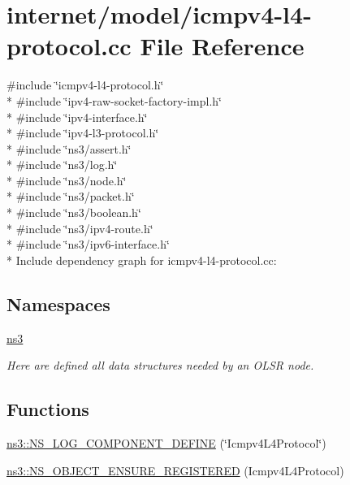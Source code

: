 \hypertarget{icmpv4-l4-protocol_8cc}{}\section{internet/model/icmpv4-\/l4-\/protocol.cc File Reference}
\label{icmpv4-l4-protocol_8cc}
{\ttfamily \#include \char`\"{}icmpv4-\/l4-\/protocol.\+h\char`\"{}}\\*
{\ttfamily \#include \char`\"{}ipv4-\/raw-\/socket-\/factory-\/impl.\+h\char`\"{}}\\*
{\ttfamily \#include \char`\"{}ipv4-\/interface.\+h\char`\"{}}\\*
{\ttfamily \#include \char`\"{}ipv4-\/l3-\/protocol.\+h\char`\"{}}\\*
{\ttfamily \#include \char`\"{}ns3/assert.\+h\char`\"{}}\\*
{\ttfamily \#include \char`\"{}ns3/log.\+h\char`\"{}}\\*
{\ttfamily \#include \char`\"{}ns3/node.\+h\char`\"{}}\\*
{\ttfamily \#include \char`\"{}ns3/packet.\+h\char`\"{}}\\*
{\ttfamily \#include \char`\"{}ns3/boolean.\+h\char`\"{}}\\*
{\ttfamily \#include \char`\"{}ns3/ipv4-\/route.\+h\char`\"{}}\\*
{\ttfamily \#include \char`\"{}ns3/ipv6-\/interface.\+h\char`\"{}}\\*
Include dependency graph for icmpv4-\/l4-\/protocol.cc\+:
\subsection*{Namespaces}
\begin{DoxyCompactItemize}
\item 
 \hyperlink{namespacens3}{ns3}
\begin{DoxyCompactList}\small\item\em Here are defined all data structures needed by an O\+L\+SR node. \end{DoxyCompactList}\end{DoxyCompactItemize}
\subsection*{Functions}
\begin{DoxyCompactItemize}
\item 
\hyperlink{namespacens3_ac96bf3d87ef574b347a906eca4570ee4}{ns3\+::\+N\+S\+\_\+\+L\+O\+G\+\_\+\+C\+O\+M\+P\+O\+N\+E\+N\+T\+\_\+\+D\+E\+F\+I\+NE} (\char`\"{}Icmpv4\+L4\+Protocol\char`\"{})
\item 
\hyperlink{namespacens3_a18840a787584540b6f35da46acb2a223}{ns3\+::\+N\+S\+\_\+\+O\+B\+J\+E\+C\+T\+\_\+\+E\+N\+S\+U\+R\+E\+\_\+\+R\+E\+G\+I\+S\+T\+E\+R\+ED} (Icmpv4\+L4\+Protocol)
\end{DoxyCompactItemize}
